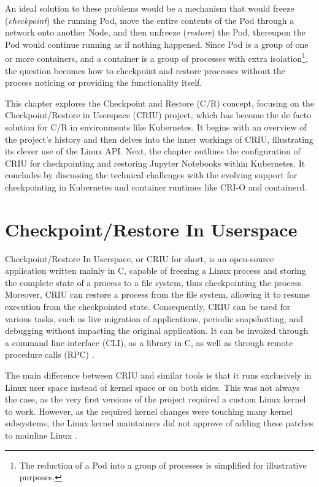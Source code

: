 \documentclass[
  digital,     %
  oneside,     %
  nosansbold,  %
  nocolorbold, %
  lof,         %
  lot,         %
]{fithesis4}
\begin{document}
An ideal solution to these problems would be a mechanism that would freeze (\emph{checkpoint}) the running Pod, move the entire contents of the Pod through a network onto another Node, and then unfreeze (\emph{restore}) the Pod, thereupon the Pod would continue running as if nothing happened. Since Pod is a group of one or more containers, and a container is a group of processes with extra isolation\footnote{The reduction of a Pod into a group of processes is simplified for illustrative purposes.}, the question becomes how to checkpoint and restore processes without the process noticing or providing the functionality itself.

This chapter explores the Checkpoint and Restore (C/R) concept, focusing on the Checkpoint/Restore in Userspace (CRIU) project, which has become the de facto solution for C/R in environments like Kubernetes. It begins with an overview of the project's history and then delves into the inner workings of CRIU, illustrating its clever use of the Linux API. Next, the chapter outlines the configuration of CRIU for checkpointing and restoring Jupyter Notebooks within Kubernetes. It concludes by discussing the technical challenges with the evolving support for checkpointing in Kubernetes and container runtimes like CRI-O and containerd.

\section{Checkpoint/Restore In Userspace}
Checkpoint/Restore In Userspace, or CRIU for short, is an open-source application written mainly in C, capable of freezing a Linux process and storing the complete state of a process to a file system, thus checkpointing the process. Moreover, CRIU can restore a process from the file system, allowing it to resume execution from the checkpointed state. Consequently, CRIU can be used for various tasks, such as live migration of applications, periodic snapshotting, and debugging without impacting the original application. It can be invoked through a command line interface (CLI), as a library in C, as well as through remote procedure calls (RPC) \cite{criu_main}.

The main difference between CRIU and similar tools is that it runs exclusively in Linux user space instead of kernel space or on both sides. This was not always the case, as the very first versions of the project required a custom Linux kernel to work. However, as the required kernel changes were touching many kernel subsystems, the Linux kernel maintainers did not approve of adding these patches to mainline Linux \cite{criu_podcast}.
\end{document}
